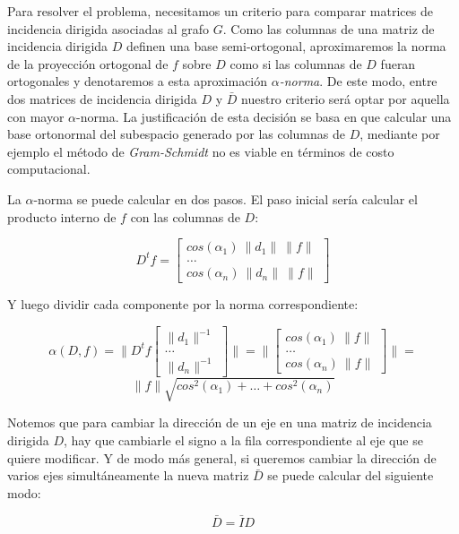 \documentclass[conference,compsoc,a4paper]{IEEEtran}
\begin{document}
\smallskip

Para resolver el problema, necesitamos un criterio para comparar  
matrices de incidencia dirigida asociadas al grafo $G$. Como las 
columnas de una matriz de incidencia dirigida $D$ definen una base 
semi-ortogonal, aproximaremos la norma de la proyección 
ortogonal de $f$ sobre $D$ como si las columnas de $D$ fueran 
ortogonales y denotaremos a esta aproximación \textit{$\alpha$-norma}.
 De este modo, entre dos matrices de incidencia dirigida $D$ y 
 $\bar{D}$ nuestro criterio será optar por aquella con mayor 
 $\alpha$-norma. La justificación de esta decisión se basa en que 
 calcular una base ortonormal del subespacio generado por las columnas 
 de $D$, mediante por ejemplo el método de \emph{Gram-Schmidt} 
 \cite{WK:2009} no es viable en términos de costo computacional.

\smallskip

La $\alpha$-norma se puede calcular en dos pasos. El paso inicial sería 
calcular el producto interno de $f$ con las columnas de $D$:

$$
D^t f = \begin{bmatrix}
	cos(\alpha_1) \ \|d_1\| \ \|f\|\\
	\dots \\
	cos(\alpha_n) \ \|d_n\| \ \|f\|
\end{bmatrix}
$$

\smallskip

Y luego dividir cada componente por la norma correspondiente:

$$
\alpha(D,f) = \| D^t f
\begin{bmatrix}
	\|d_1\|^{-1}\\
	\dots \\
	\|d_n\|^{-1} 
\end{bmatrix} \| 
=\|\begin{bmatrix}
	cos(\alpha_1) \ \|f\|\\
	\dots \\
	cos(\alpha_n) \ \|f\|
\end{bmatrix}\|=
$$
$$
\|f\|\sqrt{cos^2(\alpha_1)+\ldots+cos^2(\alpha_n)}
$$


Notemos que para cambiar la dirección de un eje en una matriz de 
incidencia dirigida $D$, hay que cambiarle el signo a la fila correspondiente al 
eje que se quiere modificar. Y de modo más general, si queremos cambiar 
la dirección de varios ejes simultáneamente la nueva matriz $\bar{D}$
se puede calcular del siguiente modo:

$$\bar{D} = \bar{I} D$$
\end{document}
